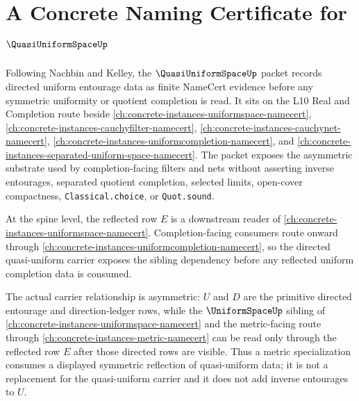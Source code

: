 \chapter{A Concrete Naming Certificate for $\QuasiUniformSpaceUp$}
\label{ch:concrete-instances-quasi-uniform-space-namecert}

Following Nachbin and Kelley, the $\QuasiUniformSpaceUp$ packet records directed uniform entourage data as finite NameCert evidence before any symmetric uniformity or quotient completion is read. It sits on the L10 Real and Completion route beside \autoref{ch:concrete-instances-uniformspace-namecert}, \autoref{ch:concrete-instances-cauchyfilter-namecert}, \autoref{ch:concrete-instances-cauchynet-namecert}, \autoref{ch:concrete-instances-uniformcompletion-namecert}, and \autoref{ch:concrete-instances-separated-uniform-space-namecert}. The packet exposes the asymmetric substrate used by completion-facing filters and nets without asserting inverse entourages, separated quotient completion, selected limits, open-cover compactness, \texttt{Classical.choice}, or \texttt{Quot.sound}.

At the spine level, the reflected row $E$ is a downstream reader of \autoref{ch:concrete-instances-uniformspace-namecert}. Completion-facing consumers route onward through \autoref{ch:concrete-instances-uniformcompletion-namecert}, so the directed quasi-uniform carrier exposes the sibling dependency before any reflected uniform completion data is consumed.

The actual carrier relationship is asymmetric: $U$ and $D$ are the primitive directed entourage and direction-ledger rows, while the $\UniformSpaceUp$ sibling of \autoref{ch:concrete-instances-uniformspace-namecert} and the metric-facing route through \autoref{ch:concrete-instances-metric-namecert} can be read only through the reflected row $E$ after those directed rows are visible. Thus a metric specialization consumes a displayed symmetric reflection of quasi-uniform data; it is not a replacement for the quasi-uniform carrier and it does not add inverse entourages to $U$.

